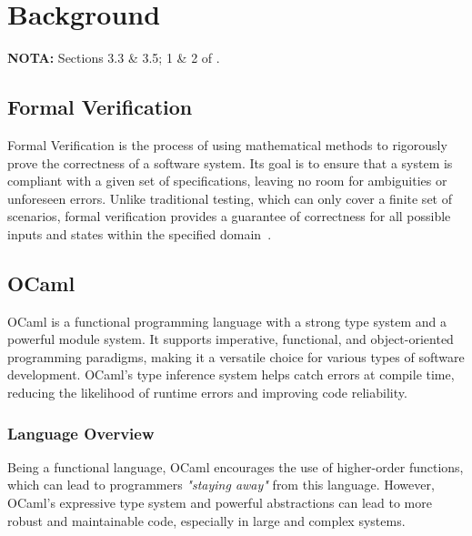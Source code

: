 
%

\chapter{Background}
\label{cha:background}

\textbf{NOTA:} Sections 3.3 \& 3.5; 1 \& 2 of \cite{Brain2025}.

\section{Formal Verification}
\label{sec:formal_verification}

Formal Verification is the process of using mathematical methods to rigorously 
prove the correctness of a software system. Its goal is to ensure that a system 
is compliant with a given set of specifications, leaving no room for ambiguities or 
unforeseen errors. Unlike traditional testing, which can only cover a 
finite set of scenarios, formal verification provides a guarantee of 
correctness for all possible inputs and states within the specified domain~\cite{Brain2025}.

\section{OCaml}
\label{sec:ocaml}

OCaml is a functional programming language with a strong type system and a powerful
module system. It supports imperative, functional, and object-oriented programming 
paradigms, making it a versatile choice for various types of software development. 
OCaml's type inference system helps catch errors at compile time, reducing the 
likelihood of runtime errors and improving code reliability.

\subsection{Language Overview} %
\label{sub:language_overview}

Being a functional language, OCaml encourages the use of higher-order functions,
which can lead to programmers \textit{"staying away"} from this language. However,
OCaml's expressive type system and powerful abstractions can lead to more robust
and maintainable code, especially in large and complex systems.

